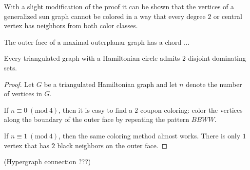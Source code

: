 \begin{remark}
  With a slight modification of the proof it can be shown that the vertices of a
  generalized sun graph cannot be colored in a way that every degree $2$ or central
  vertex has neighbors from both color classes.
\end{remark}

\begin{lemma}
  The outer face of a maximal outerplanar graph has a chord ...
\end{lemma}

\begin{thm}
  Every triangulated graph with a Hamiltonian circle admits $2$ disjoint
  dominating sets.
\end{thm}
\begin{proof}
  Let $G$ be a triangulated Hamiltonian graph and let $n$ denote the number of
  vertices in $G$.

  If $n \equiv 0\ (\textrm{mod}\ 4)$, then it is easy to find a $2$-coupon coloring:
  color the vertices along the boundary of the outer face by repeating the pattern
  $BBWW$.

  If $n \equiv 1\ (\textrm{mod}\ 4)$, then the same coloring method almost works.
  There is only $1$ vertex that has $2$ black neighbors on the outer face.
\end{proof}


(Hypergraph connection ???)
